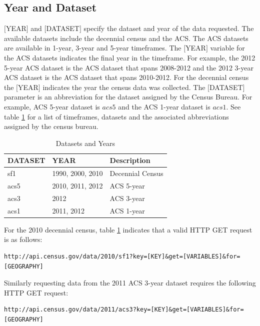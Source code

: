 \documentclass{article}\usepackage[]{graphicx}\usepackage[]{color}
\begin{document}
\subsection{Year and Dataset}
$[$YEAR$]$ and $[$DATASET$]$ specify the dataset and year of the data requested.  The available datasets include the decennial census and the ACS.  The ACS datasets are available in 1-year, 3-year and 5-year timeframes.  The $[$YEAR$]$ variable for the ACS datasets indicates the final year in the timeframe.  For example, the 2012 5-year ACS dataset is the ACS dataset that spans 2008-2012 and the 2012 3-year ACS dataset is the ACS dataset that spans 2010-2012.  For the decennial census the $[$YEAR$]$ indicates the year the census data was collected.  The $[$DATASET$]$ parameter is an abbreviation for the dataset assigned by the Census Bureau.  For example, ACS 5-year dataset is $acs5$ and the ACS 1-year dataset is $acs1$.  See table \ref{tab:datasettable} for a list of timeframes, datasets and the associated abbreviations assigned by the census bureau.\\
\begin{table}[ht]
\centering
\begin{tabular}{lll}
  \hline
DATASET & YEAR & Description \\ 
  \hline
sf1 & 1990, 2000, 2010 & Decennial Census \\ 
  acs5 & 2010, 2011, 2012 & ACS 5-year \\ 
  acs3 & 2012 & ACS 3-year \\ 
  acs1 & 2011, 2012 & ACS 1-year \\ 
   \hline
\end{tabular}
\caption{Datasets and Years} 
\label{tab:datasettable}
\end{table}


For the 2010 decennial census, table \ref{tab:datasettable} indicates that a valid HTTP GET request is as follows:
\begin{verbatim}
http://api.census.gov/data/2010/sf1?key=[KEY]&get=[VARIABLES]&for=[GEOGRAPHY]
\end{verbatim}
Similarly requesting data from the 2011 ACS 3-year dataset requires the following HTTP GET request:
\begin{verbatim}
http://api.census.gov/data/2011/acs3?key=[KEY]&get=[VARIABLES]&for=[GEOGRAPHY]
\end{verbatim}
\end{document}
